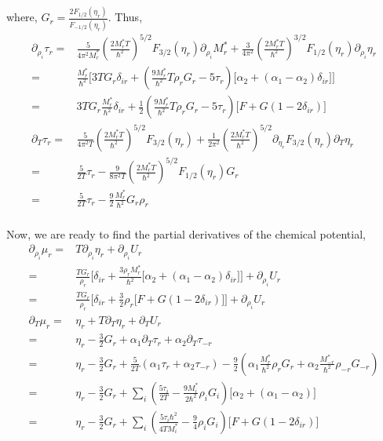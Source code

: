 \documentclass[preprint,prc,preprintnumbers,superscriptaddress,amsmath,amssymb,floatfix]{revtex4-1}
\begin{document}
where, $G_r = \frac{2 F_{1/2}(\eta_r)}{F_{-1/2}(\eta_r)}$.
Thus,
\begin{equation}
 \begin{split}
 \partial_{\rho_i}\tau_r=&\frac{5}{4\pi^2 M^{*}_r}(\frac{2 M_r^{*}T}{\hbar^2})^{5/2}F_{3/2}(\eta_r)\partial_{\rho_i}M^{*}_r+\frac{3}{4\pi^2}(\frac{2 M_r^{*}T}{\hbar^2})^{3/2}F_{1/2}(\eta_r)\partial_{\rho_i}\eta_r\\
 =&\frac{M_r^{*}}{\hbar^2}\Big[3 T G_r \delta_{ir} +(\frac{9 M_r^{*}}{\hbar^2} T \rho_r G_r - 5 \tau_r)\big[\alpha_2+(\alpha_1-\alpha_2)\delta_{ir}\big] \Big]\\
  =&3 T G_r\frac{M_r^{*}}{\hbar^2} \delta_{ir} +\frac{1}{2}(\frac{9 M_r^{*}}{\hbar^2} T \rho_r G_r - 5 \tau_r)\big[F+G(1-2\delta_{ir})\big]\\
  \partial_{T}\tau_r=&\frac{5}{4\pi^2 T}(\frac{2 M^{*}_rT}{\hbar^2})^{5/2} F_{3/2}(\eta_r)+\frac{1}{2\pi^2}(\frac{2 M_r^{*}T}{\hbar^2})^{5/2}\partial_{\eta_r}F_{3/2}(\eta_r)\partial_{T}\eta_r\\
  =&\frac{5}{2T}\tau_r-\frac{9}{8\pi^2 T}(\frac{2 M^{*}_rT}{\hbar^2})^{5/2} F_{1/2}(\eta_r)G_r\\
  =&\frac{5}{2T}\tau_r-\frac{9}{2}\frac{M_r^{*}}{\hbar^2}G_r\rho_r\\
 \end{split}
\end{equation}

Now, we are ready to find the partial derivatives of the chemical potential,
\begin{equation}
 \begin{split}
  \partial_{\rho_i}\mu_r =& T\partial_{\rho_i}\eta_r + \partial_{\rho_i} U_r\\
  =&\frac{TG_r}{\rho_r}\Big[\delta_{ir}+\frac{3 \rho_r M_r^{*}}{\hbar^2}\big[\alpha_2+(\alpha_1-\alpha_2)\delta_{ir}\big]\Big] + \partial_{\rho_i} U_r\\
  =&\frac{TG_r}{\rho_r}\Big[\delta_{ir}+\frac{3}{2}\rho_r\big[F+G(1-2\delta_{ir})\big]\Big] + \partial_{\rho_i} U_r\\
  \partial_{T}\mu_r=& \eta_r + T \partial_{T}\eta_r +\partial_{T}U_r\\
  =&\eta_r - \frac{3}{2}G_r+\alpha_1 \partial_{T}\tau_r+\alpha_2 \partial_{T}\tau_{-r}\\
  =&\eta_r - \frac{3}{2}G_r+\frac{5}{2T}(\alpha_1\tau_r+\alpha_2\tau_{-r})- \frac{9}{2} (\alpha_1 \frac{M_r^{*}}{\hbar^2}\rho_r G_r+\alpha_2 \frac{M_{-r}^{*}}{\hbar^2}\rho_{-r} G_{-r})\\
  =&\eta_r - \frac{3}{2}G_r+\sum_i (\frac{5\tau_i}{2T}-\frac{9M_i^{*}}{2 \hbar^2}\rho_i G_i) \big[\alpha_2+(\alpha_1-\alpha_2)\big]\\
  =&\eta_r - \frac{3}{2}G_r+\sum_i (\frac{5\tau_i \hbar^2}{4TM_i^{*}}-\frac{9}{4}\rho_iG_i) \big[F+G(1-2\delta_{ir})\big]
 \end{split}
\end{equation}
\end{document}
